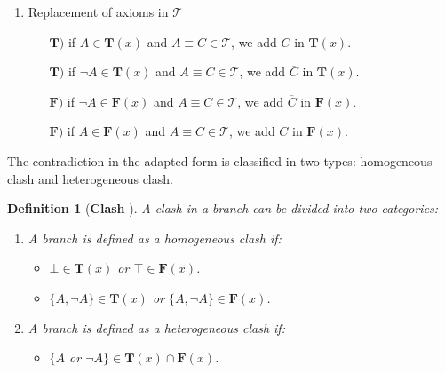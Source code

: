 \documentclass{article}
\newtheorem{mydef}{Definition}
\begin{document}
\begin{enumerate}
	 \item Replacement of axioms in $\mathcal{T}$
	       \begin{itemize}
	        \item  [$\mathbf{T)}$] if $A \in \mathbf{T}(x)$ and $A \equiv C \in \mathcal{T}$, we add $C$ in $\mathbf{T}(x)$.
		\item  [$\mathbf{T)}$] if $ \neg A \in \mathbf{T}(x)$ and $A \equiv C \in \mathcal{T}$, we add $\overline{C}$ in $\mathbf{T}(x)$.
	        \item  [$\mathbf{F)}$] if $ \neg A \in \mathbf{F}(x)$ and $A \equiv C \in \mathcal{T}$, we add $\overline{C}$ in $\mathbf{F}(x)$. 	
	        \item  [$\mathbf{F)}$] if $ A \in \mathbf{F}(x)$ and $A \equiv C \in \mathcal{T}$, we add $C$ in $\mathbf{F}(x)$.
	       \end{itemize}     
\end{enumerate}

The contradiction in the adapted form is classified in two types: homogeneous clash and heterogeneous clash. 
\begin{mydef}[\textbf{Clash} \cite{colucci2004uniform}]
A clash in a branch can be divided into two categories:
\begin{enumerate}
	 \item A branch is defined as a homogeneous clash if:
	       \begin{itemize}
	        \item  $\bot \in \mathbf{T}(x)$ or $\top \in \mathbf{F}(x)$.
	        \item  $\{A,\neg A\} \in \mathbf{T}(x)$ or $\{A,\neg A\} \in \mathbf{F}(x)$.
		\end{itemize}
	 \item A branch is defined as a heterogeneous clash if:
	       \begin{itemize}
	        \item   $\{A$ or $\neg A\} \in \mathbf{T}(x) \cap \mathbf{F}(x)$. 
	       \end{itemize}     
\end{enumerate}
\label{clash}
\end{mydef}
\end{document}

